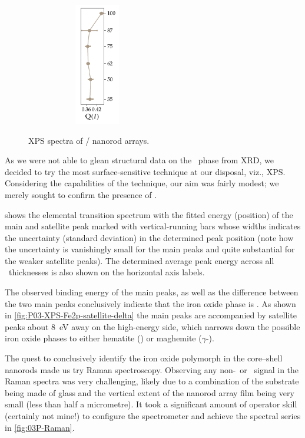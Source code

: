 \documentclass[webedition,openright,titles,swedish,english]{LuaUUThesis}\usepackage[]{graphicx}\usepackage[]{xcolor}
\newenvironment{knitrout}{}{} %
\newcommand{\viz}{viz.}
\begin{document}
\begin{figure}[tbp]
\begin{subfigure}[b]{0.33\textwidth}
\begin{subfigure}[b]{0.50\linewidth}
\begin{knitrout}
{\centering \includegraphics[width=0.77in]{figure/0503P-fig-xps-Fe2p-main-ratio-1} 

}


\end{knitrout}
\caption{}%
\label{fig:P03-XPS-Fe2p-main-ratio}%
\end{subfigure}%
\end{subfigure}%
\caption[XPS spectra of \ZnO/ nanorod arrays]{%
   XPS spectra of / nanorod arrays.}
\label{fig:P03-XPS-Fe2p}%
\end{figure}

As we were not able to glean structural data on the \ironox\ phase from \gls{XRD},
we decided to try the most surface-sensitive technique at our disposal, \viz,
\gls{XPS}. Considering the capabilities of the technique, our aim was fairly modest;
we merely sought to confirm the presence of \hematite.

 shows the  elemental transition spectrum
with the fitted energy (position) of the main and satellite peak marked with
vertical-running bars whose widths indicates the uncertainty (standard deviation) in the determined
peak position (note how the uncertainty is vanishingly small for the main peaks
and quite substantial for the weaker satellite peaks).
The determined average peak energy across all \ironox\ thicknesses is also
shown on the horizontal axis labels.

The observed binding energy of the main peaks, as well as the difference between
the two main peaks conclusively indicate that the iron oxide phase is \ironox.
As shown in \cref{fig:P03-XPS-Fe2p-satellite-delta} the main peaks are
accompanied by satellite peaks about \qty{8}{\eV} away on the high-energy side,
which narrows down the possible iron oxide phases to either hematite (\hematite)
or maghemite ($\gamma$-).




The quest to conclusively identify the iron oxide polymorph in the core--shell
nanorods made us try Raman spectroscopy. Observing any non-\ZnO\ or \tinox\ signal
in the Raman spectra was very challenging, likely due to a combination of the
substrate being made of glass and the vertical extent of the nanorod array film
being very small (less than half a micrometre).
It took a significant amount of operator skill (certainly not mine!) to configure
the spectrometer and achieve the spectral series in \cref{fig:03P-Raman}.
\end{document}

